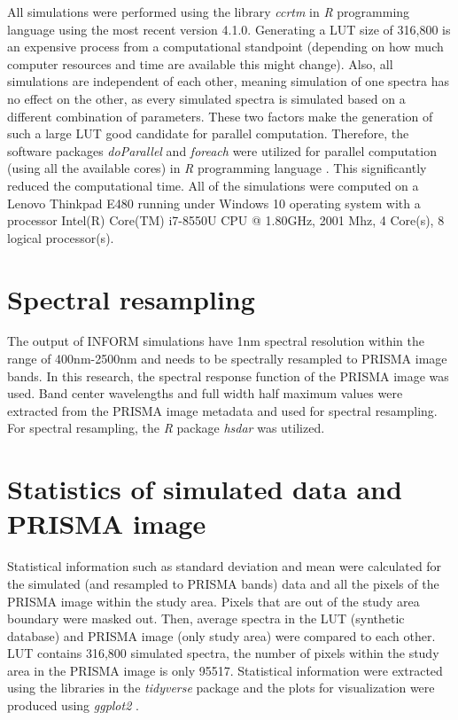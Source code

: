 \documentclass[a4paper, nobind]{templates/ociamthesis}
\begin{document}
All simulations were performed using the library \emph{ccrtm} \citep{ccrtm} in \emph{R} programming language \citep{r} using the most recent version 4.1.0. Generating a LUT size of 316,800 is an expensive process from a computational standpoint (depending on how much computer resources and time are available this might change). Also, all simulations are independent of each other, meaning simulation of one spectra has no effect on the other, as every simulated spectra is simulated based on a different combination of parameters. These two factors make the generation of such a large LUT good candidate for parallel computation. Therefore, the software packages \emph{doParallel} \citep{doparallel} and \emph{foreach} \citep{foreach} were utilized for parallel computation (using all the available cores) in \emph{R} programming language \citep{r}. This significantly reduced the computational time. All of the simulations were computed on a Lenovo Thinkpad E480 running under Windows 10 operating system with a processor Intel(R) Core(TM) i7-8550U CPU @ 1.80GHz, 2001 Mhz, 4 Core(s), 8 logical processor(s).

\hypertarget{spectral-resampling}{%
\section{Spectral resampling}\label{spectral-resampling}}

The output of INFORM simulations have 1nm spectral resolution within the range of 400nm-2500nm and needs to be spectrally resampled to PRISMA image bands. In this research, the spectral response function of the PRISMA image was used. Band center wavelengths and full width half maximum values were extracted from the PRISMA image metadata and used for spectral resampling. For spectral resampling, the \emph{R} package \emph{hsdar} \citep{hsdar} was utilized.

\hypertarget{statistics-of-simulated-data-and-prisma-image}{%
\section{Statistics of simulated data and PRISMA image}\label{statistics-of-simulated-data-and-prisma-image}}

Statistical information such as standard deviation and mean were calculated for the simulated (and resampled to PRISMA bands) data and all the pixels of the PRISMA image within the study area. Pixels that are out of the study area boundary were masked out. Then, average spectra in the LUT (synthetic database) and PRISMA image (only study area) were compared to each other. LUT contains 316,800 simulated spectra, the number of pixels within the study area in the PRISMA image is only 95517. Statistical information were extracted using the libraries in the \emph{tidyverse} package \citep{tidyverse} and the plots for visualization were produced using \emph{ggplot2} \citep{ggplot2}.
\end{document}

